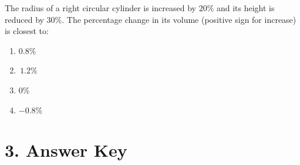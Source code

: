 \documentclass[11pt]{article}
\begin{document}
\begin{tcolorbox}
The radius of a right circular cylinder is increased by \(20\%\) and its height is reduced by \(30\%\). The percentage change in its volume (positive sign for increase) is closest to:
\end{tcolorbox}

\begin{enumerate}[label=(\Alph*)]
    \item \(0.8\%\)
    \item \(\,1.2\%\)
    \item \(0\%\)
    \item \(-0.8\%\)
\end{enumerate}

\newpage
\section*{3. Answer Key}
\end{document}
